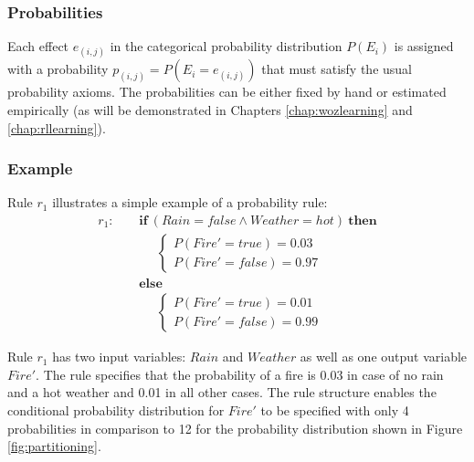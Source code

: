 \subsubsection*{Probabilities}

Each effect $e_{(i,j)}$ in the categorical probability distribution $P(E_i)$ is assigned with a probability $p_{(i,j)} = P(E_i = e_{(i,j)})$ that must satisfy the usual probability axioms.  The probabilities can be either fixed by hand or estimated empirically (as will be demonstrated in Chapters \ref{chap:wozlearning} and \ref{chap:rllearning}).


\subsubsection*{Example}

Rule $r_1$ illustrates a simple example of a probability rule:
\begin{align*}
r_1: \ \ \ \ \ & \textbf{if} \ (\mathit{Rain}\!=\!\mathit{false} \land \mathit{Weather}\!=\!\mathit{hot}) \ \textbf{then} \\
& \;\;\;\;\;  \begin{cases}
 P(\mathit{Fire}'\!=\!\mathit{true}) = 0.03 \\ 
P(\mathit{Fire}'\!=\!\mathit{false}) = 0.97
\end{cases} \\ 
& \textbf{else} \\
& \;\;\;\;\; \begin{cases}
P(\mathit{Fire}'\!=\!\mathit{true}) = 0.01 \\
P(\mathit{Fire}'\!=\!\mathit{false}) = 0.99
\end{cases} 
\end{align*}

Rule $r_1$ has two input variables: $\mathit{Rain}$ and $\mathit{Weather}$ as well as one output variable $\mathit{Fire}'$. The rule specifies that the probability of a fire is 0.03 in case of no rain and a hot weather and 0.01 in all other cases.  The rule structure enables the conditional probability distribution for $\mathit{Fire}'$ to be specified with only 4 probabilities in comparison to 12 for the probability distribution shown in Figure \ref{fig:partitioning}. 

